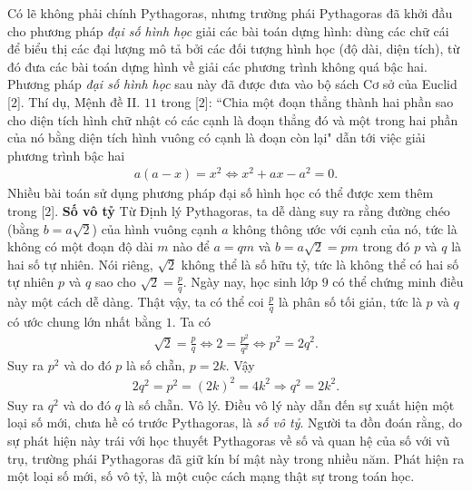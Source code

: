 \begin{multicols}{2}
	\vskip 0.1cm
	Có lẽ không phải chính Pythagoras, nhưng trường phái Pythagoras đã khởi đầu cho phương pháp \textit{đại số hình học} giải các bài toán dựng hình: dùng các chữ cái để biểu thị các đại lượng mô tả bởi các đối tượng hình học (độ dài, diện tích), từ đó đưa các bài toán dựng hình về giải các phương trình không quá bậc hai. Phương pháp \textit{đại số hình học} sau này đã được đưa vào bộ sách Cơ sở của Euclid [$2$]. Thí dụ, Mệnh đề II. $11$ trong [$2$]: ``Chia một đoạn thẳng thành hai phần sao cho diện tích hình chữ nhật có các cạnh là đoạn thẳng đó và một trong hai phần của nó bằng diện tích hình vuông có cạnh là đoạn còn lại" dẫn tới việc giải phương trình bậc hai 
	\begin{align*}
		a\left( {a - x} \right) = {x^2} \Leftrightarrow {x^2} + ax - {a^2} = 0.
	\end{align*}
	Nhiều bài toán sử dụng phương pháp đại số hình học có thể được xem thêm trong [$2$].
	\vskip 0.1cm
	\textbf{\color{lichsutoanhoc}Số vô tỷ}
	\vskip 0.1cm  Từ Định lý Pythagoras, ta dễ dàng suy ra rằng đường chéo (bằng  $b = a\sqrt{2}$)  của hình vuông cạnh $a$  không thông ước với cạnh của nó, tức là không có một đoạn độ dài $m$  nào để $a= qm$  và $b = a\sqrt{2}= pm$ trong đó  $p$  và $q$ là hai số tự nhiên. Nói riêng, $\sqrt{2}$  không thể là số hữu tỷ, tức là không thể có hai số tự nhiên $p$  và $q$  sao cho $\sqrt{2} = \frac{p}{q}$.   Ngày nay, học sinh lớp $9$ có thể chứng minh điều này một cách dễ dàng. Thật vậy, ta có thể coi  $\frac{p}{q}$  là  phân số tối giản, tức là $p$  và $q$  có ước chung lớn nhất bằng $1$. Ta có
	\begin{align*}
		\sqrt 2  = \frac{p}{q} \Leftrightarrow 2 = \frac{{{p^2}}}{{{q^2}}} \Leftrightarrow {p^2} = 2{q^2}.
	\end{align*}
	Suy ra $p^2$  và do đó $p$   là số chẵn, $p = 2k$.  Vậy
	\begin{align*}
		2{q^2} = {p^2} = {\left( {2k} \right)^2} = 4{k^2} \Rightarrow {q^2} = 2{k^2}.
	\end{align*}
	Suy ra $q^2$  và do đó $q$   là số chẵn. Vô lý.
	\vskip 0.1cm
	Điều vô lý này dẫn đến sự xuất hiện một loại số mới, chưa hề có trước Pythagoras, là \textit{số vô tỷ}. Người ta đồn đoán rằng, do sự phát hiện này trái với học thuyết Pythagoras về số và quan hệ của số với vũ trụ, trường phái Pythagoras đã giữ kín bí mật này trong nhiều năm.
	\vskip 0.1cm
	Phát hiện ra một loại số mới, số vô tỷ, là một cuộc cách mạng thật sự trong toán học. 
	\begin{figure}[H]
		\vspace*{-5pt}

\end{figure}
\end{multicols}
